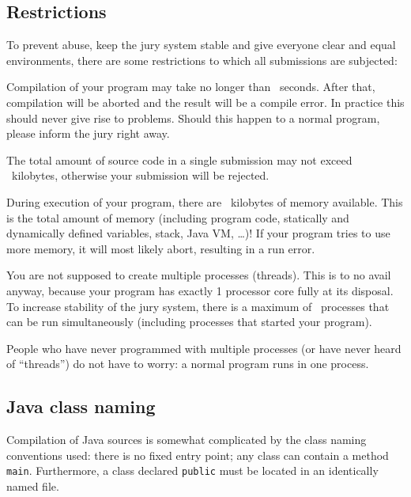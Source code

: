 \subsection{Restrictions}\label{runlimits}

To prevent abuse, keep the jury system stable and give everyone
clear and equal environments, there are some restrictions to which all
submissions are subjected:

\begin{description}
\item[compile time]
Compilation of your program may take no longer than \COMPILETIME\
seconds. After that, compilation will be aborted and the result will
be a compile error. In practice this should never give rise to
problems. Should this happen to a normal program, please inform the
jury right away.

\item[source size]
The total amount of source code in a single submission may not exceed
\SOURCESIZE\ kilobytes, otherwise your submission will be rejected.

\item[memory]
During execution of your program, there are \MEMLIMIT\ kilobytes of
memory available. This is the total amount of memory (including
program code, statically and dynamically defined variables, stack,
Java VM, \dots)! If your program tries to use more memory, it will
most likely abort, resulting in a run error.

\item[number of processes]
You are not supposed to create multiple processes (threads). This is
to no avail anyway, because your program has exactly 1 processor core fully
at its disposal. To increase stability of the jury system, there is a
maximum of \PROCLIMIT\ processes that can be run simultaneously
(including processes that started your program).

People who have never programmed with multiple processes (or have
never heard of ``threads'') do not have to worry: a normal program
runs in one process.

\end{description}

\subsection{Java class naming}

Compilation of Java sources is somewhat complicated by the class
naming conventions used: there is no fixed entry point; any class can
contain a method \texttt{main}. Furthermore, a class declared
\texttt{public} must be located in an identically named file.

